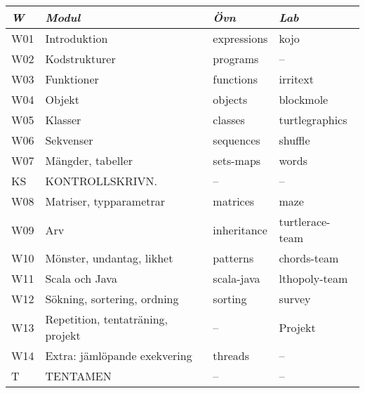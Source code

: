 \begin{tabular}{l|l|l|l}
\textit{W} & \textit{Modul} & \textit{Övn} & \textit{Lab} \\ \hline \hline
W01 & Introduktion & expressions & kojo \\
W02 & Kodstrukturer & programs & -- \\
W03 & Funktioner & functions & irritext \\
W04 & Objekt & objects & blockmole \\
W05 & Klasser & classes & turtlegraphics \\
W06 & Sekvenser & sequences & shuffle \\
W07 & Mängder, tabeller & sets-maps & words \\
KS & KONTROLLSKRIVN. & -- & -- \\
W08 & Matriser, typparametrar & matrices & maze \\
W09 & Arv & inheritance & turtlerace-team \\
W10 & Mönster, undantag, likhet & patterns & chords-team \\
W11 & Scala och Java & scala-java & lthopoly-team \\
W12 & Sökning, sortering, ordning & sorting & survey \\
W13 & Repetition, tentaträning, projekt & -- & Projekt \\
W14 & Extra: jämlöpande exekvering & threads & -- \\
T & TENTAMEN & -- & -- \\
\end{tabular}

